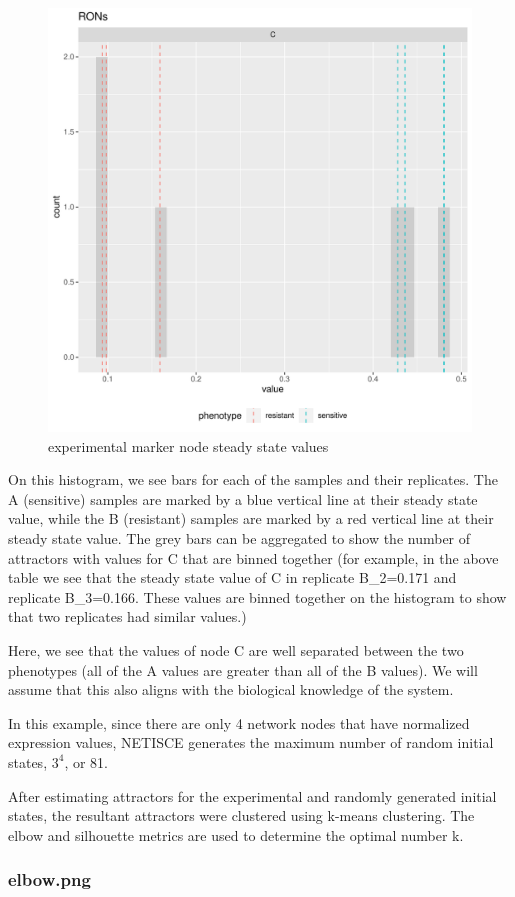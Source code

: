 \documentclass[
]{book}
\begin{document}
\begin{figure}

{\centering \includegraphics[width=0.5\linewidth]{results/experimental_internalmarkers} 

}

\caption{experimental marker node steady state values}\label{fig:unnamed-chunk-10}
\end{figure}

On this histogram, we see bars for each of the samples and their replicates. The A (sensitive) samples are marked by a blue vertical line at their steady state value, while the B (resistant) samples are marked by a red vertical line at their steady state value. The grey bars can be aggregated to show the number of attractors with values for C that are binned together (for example, in the above table we see that the steady state value of C in replicate B\_2=0.171 and replicate B\_3=0.166. These values are binned together on the histogram to show that two replicates had similar values.)

Here, we see that the values of node C are well separated between the two phenotypes (all of the A values are greater than all of the B values). We will assume that this also aligns with the biological knowledge of the system.

In this example, since there are only 4 network nodes that have normalized expression values, NETISCE generates the maximum number of random initial states, \(3^4\), or 81.

After estimating attractors for the experimental and randomly generated initial states, the resultant attractors were clustered using k-means clustering. The elbow and silhouette metrics are used to determine the optimal number k.

\hypertarget{section-id}{%
\subsubsection*{elbow.png}\label{section-id}}
\end{document}
